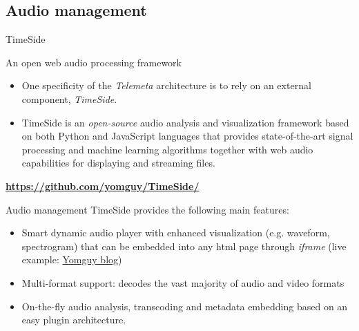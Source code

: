 \documentclass[final, hyperref, table]{beamer}
\begin{document}
\subsection{Audio management}
\begin{frame}{TimeSide}\scriptsize
 \begin{block}{An open web audio processing framework}
   \begin{itemize}
   \item One specificity of the \emph{Telemeta} architecture is to
     rely on an external component, \emph{TimeSide}.
   \item TimeSide is an
     \emph{open-source} \alert{audio analysis and visualization framework} based on
     both \alert{Python and JavaScript} languages that provides
     state-of-the-art signal processing and machine learning
     algorithms together with \alert{web audio} capabilities for displaying
     and streaming files.
   \end{itemize}
\vspace{-0.5cm}\begin{center}
  \colorbox{yellow!40}{\bf \url{https://github.com/yomguy/TimeSide/} }
\end{center}
\end{block}
\begin{block}{Audio management}
  TimeSide provides the following main features:
  \begin{itemize}
   \item Smart dynamic audio player with enhanced visualization (e.g. waveform,
    spectrogram) that can be embedded into any html page through \emph{iframe} (live example: \href{http://yomix.org/category/projects.html}{Yomguy blog})
  \item Multi-format support: decodes the vast majority of audio and
    video formats%
  \item On-the-fly audio analysis, transcoding and metadata embedding
    based on an easy plugin architecture.
  \end{itemize}
\end{block}

 
\end{frame} 
\end{document}
